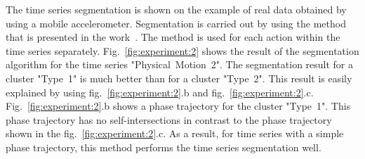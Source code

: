 \documentclass[12pt, twoside]{article}
\numberwithin{equation}{section}
\begin{document}




The time series segmentation is shown on the example of real data obtained by using a mobile accelerometer. Segmentation is carried out by using the method that is presented in the work~\cite{motrenko2015}. The method is used for each action within the time series separately.
Fig.~\ref{fig:experiment:2} shows the result of the segmentation algorithm for the time series "Physical~Motion~2". The segmentation result for a cluster "Type~1" is much better than for a cluster "Type~2". This result is easily explained by using fig.~\ref{fig:experiment:2}.b and fig.~\ref{fig:experiment:2}.c. Fig.~\ref{fig:experiment:2}.b shows a phase trajectory for the cluster "Type~1". This phase trajectory has no self-intersections in contrast to the phase trajectory shown in the fig.~\ref{fig:experiment:2}.c.
As a result, for time series with a simple phase trajectory, this method performs the time series segmentation well.

\end{document}
